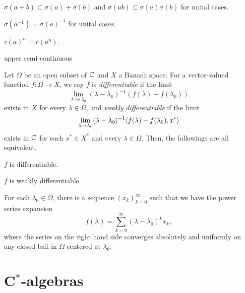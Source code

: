 \documentclass{../../large}
\begin{document}
\begin{prb}
\begin{parts}
\item $\sigma(a+b)\subset\sigma(a)+\sigma(b)$ and $\sigma(ab)\subset\sigma(a)\sigma(b)$ for unital cases.
\item $\sigma(a^{-1})=\sigma(a)^{-1}$ for unital cases.
\item $r(a)^n=r(a^n)$.
\end{parts}
\end{prb}

\begin{prb}
\begin{parts}
\item upper semi-continuous
\end{parts}
\end{prb}

\begin{prb}
Let $\Omega$ be an open subset of $\mathbb{C}$ and $X$ a Banach space.
For a vector-valued function $f:\Omega\to X$, we say $f$ is \emph{differentiable} if the limit
\[\lim_{\lambda\to\lambda_0}(\lambda-\lambda_0)^{-1}(f(\lambda)-f(\lambda_0))\]
exists in $X$ for every $\lambda\in\Omega$, and \emph{weakly differentiable} if the limit
\[\lim_{\lambda\to\lambda_0}(\lambda-\lambda_0)^{-1}\langle f(\lambda)-f(\lambda_0),x^*\rangle\]
exists in $\mathbb{C}$ for each $x^*\in X^*$ and every $\lambda\in\Omega$.
Then, the followings are all equivalent.
\begin{parts}
\item $f$ is differentiable.
\item $f$ is weakly differentiable.
\item For each $\lambda_0\in\Omega$, there is a sequence $(x_k)_{k=0}^\infty$ such that we have the power series expansion
\[f(\lambda)=\sum_{k=0}^\infty(\lambda-\lambda_0)^kx_k,\]
where the series on the right hand side converges absolutely and uniformly on any closed ball in $\Omega$ centered at $\lambda_0$.
\end{parts}
\end{prb}

\begin{prb}
\end{prb}







\chapter{C$^*$-algebras}
\end{document}
